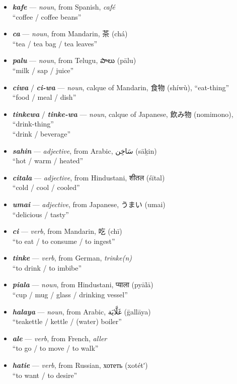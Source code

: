 \documentclass[a4paper]{article}
\begin{document}
\begin{itemize}
	\item \textbf{\textit{kafe}} — \textit{noun}, from Spanish, \textit{café} \\``coffee / coffee beans''
	\item \textbf{\textit{ca}} — \textit{noun}, from Mandarin, 茶 (chá) \\``tea / tea bag / tea leaves''
	\item \textbf{\textit{palu}} — \textit{noun}, from Telugu, {\tlgfont పాలు} (pālu) \\``milk / sap / juice''
	\item \textbf{\textit{ciwa}} / \textbf{\textit{ci-wa}} — \textit{noun}, calque of Mandarin, 食物 (shíwù), ``eat-thing'' \\``food / meal / dish''
	\item \textbf{\textit{tinkewa}}  / \textbf{\textit{tinke-wa}} — \textit{noun}, calque of Japanese, 飲み物 (nomimono), ``drink-thing'' \\``drink / beverage''
	\item \textbf{\textit{sahin}} — \textit{adjective}, from Arabic, {\afont  سَاخِن } (sāḵin) \\``hot / warm / heated''
	\item \textbf{\textit{citala}} — \textit{adjective}, from Hindustani, {\hmfont शीतल} (śītal) \\``cold / cool / cooled''
	\item \textbf{\textit{umai}} — \textit{adjective}, from Japanese, うまい (umai) \\``delicious / tasty''
	\item \textbf{\textit{ci}} — \textit{verb}, from Mandarin, 吃 (chī) \\``to eat / to consume / to ingest''
	\item \textbf{\textit{tinke}} — \textit{verb}, from German, \textit{trinke(n)} \\``to drink / to imbibe''
	\item \textbf{\textit{piala}} — \textit{noun}, from Hindustani, {\hmfont  प्याला} (pyālā) \\ ``cup / mug / glass / drinking vessel''
	\item \textbf{\textit{halaya}} — \textit{noun}, from Arabic, {\afont  غَلَّايَة } (ḡallāya) \\ ``teakettle / kettle / (water) boiler''
	\item \textbf{\textit{ale}} — \textit{verb}, from French, \textit{aller} \\``to go / to move / to walk''
	\item \textbf{\textit{hatie}} — \textit{verb}, from Russian, хотеть (xotétʹ) \\ ``to want / to desire''

\end{itemize}
\end{document}
